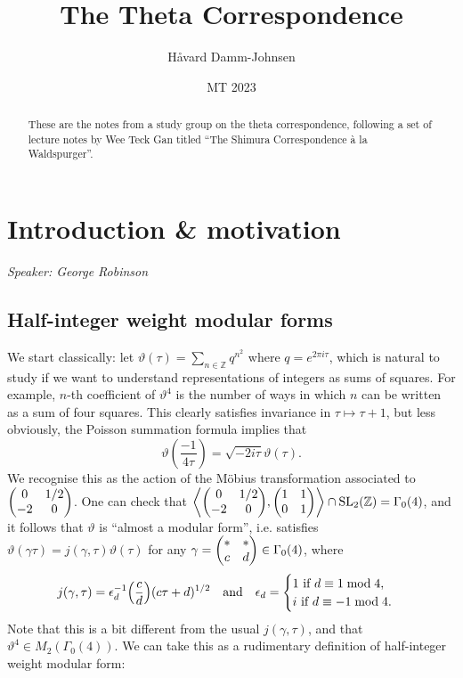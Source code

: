 \documentclass[11pt,a4paper,leqno]{article}
\newcommand{\1}{\mathbbm{1}}
\newcommand{\Z}{\mathbb{Z}}
\renewcommand{\theta}{\vartheta}
\DeclareMathOperator{\SL}{SL}
\theoremstyle{plain}
\theoremstyle{definition}
\theoremstyle{remark}
\numberwithin{equation}{section}
\begin{document}
\title{\vspace{-1cm} The Theta Correspondence}
\author{Håvard Damm-Johnsen}
\date{MT 2023}
\maketitle%
\begin{abstract}
  These are the notes from a study group on the theta correspondence,
  following a set of lecture notes by Wee Teck Gan titled ``The
  Shimura Correspondence à la Waldspurger''. 
\end{abstract}
\begin{spacing}{0.1}
\tableofcontents
\end{spacing}

\section{Introduction \& motivation}
\label{sec:intro}
\emph{Speaker: George Robinson}
\subsection{Half-integer weight modular forms}
\label{sec:half-integer-weight}

We start classically: let $\theta(\tau) = \sum_{n \in \Z}q^{n^{2}}$ where $q =
e^{2\pi i \tau}$, which is natural to study if we want to understand
representations of integers as sums of squares. For example, $n$-th
coefficient of $\theta^{4}$ is the number of ways in which $n$ can be
written as a sum of four squares. This clearly satisfies invariance in
$\tau \mapsto \tau + 1$, but less obviously, the Poisson summation formula implies
that 
\begin{equation}
  \label{eq:1}
\theta(\frac{-1}{4\tau}) = \sqrt{-2i\tau}\theta(\tau).
\end{equation}
We recognise this as the action of the Möbius transformation
associated to $\mqty(0  & 1/2 \\ -2 & 0)$.
One can check that $\left\langle \mqty(0  & 1/2 \\ -2 & 0), \mqty(1  & 1 \\
  0 & 1)\right\rangle \cap \SL_{2}(\Z) = \Gamma_{0}(4)$, and it follows that $\theta$
is ``almost a modular form'', i.e. satisfies $\theta(\gamma \tau) = j(\gamma,\tau)\theta(\tau)$ for any $\gamma = \mqty(*  & *
\\ c & d) \in \Gamma_{0}(4)$, where
\begin{equation}
  \label{eq:2}
  j(\gamma,\tau) = \epsilon_{d}^{-1}
  \qty(\frac{c}{d})(c\tau+d)^{1/2} \qq{and} \epsilon_{d} = \begin{cases}
                                                   1 \text{ if } d \equiv 1 \bmod{4},
                                                   \\ i \text{ if } d \equiv -1
                                                   \bmod{4}.
                                         \end{cases}
\end{equation}
Note that this is a bit different from the usual $j(\gamma,\tau)$, and that
$\theta^{4} \in M_{2}(\Gamma_{0}(4))$. We can take this as a rudimentary
definition of half-integer weight modular form:
\end{document}
